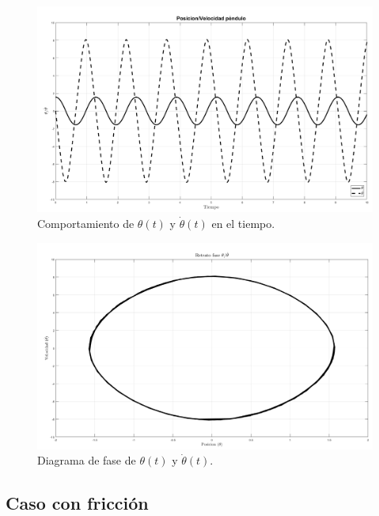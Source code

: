\begin{figure}[hb]
 \centering 
 \includegraphics[scale=0.3]{./img/PosVelNF.png}
 \caption{Comportamiento de $\theta(t)$ y $\dot{\theta}(t)$ en el tiempo.}
 \label{fig: time plot theta dtheta no friction}
\end{figure}

\begin{figure}[hb]
 \centering 
 \includegraphics[scale=0.3]{./img/faseNF.png}
\caption{Diagrama de fase de $\theta(t)$ y $\dot{\theta}(t)$.}
 \label{fig: phase plot theta no friction}
\end{figure}



\subsection{Caso con fricción}

